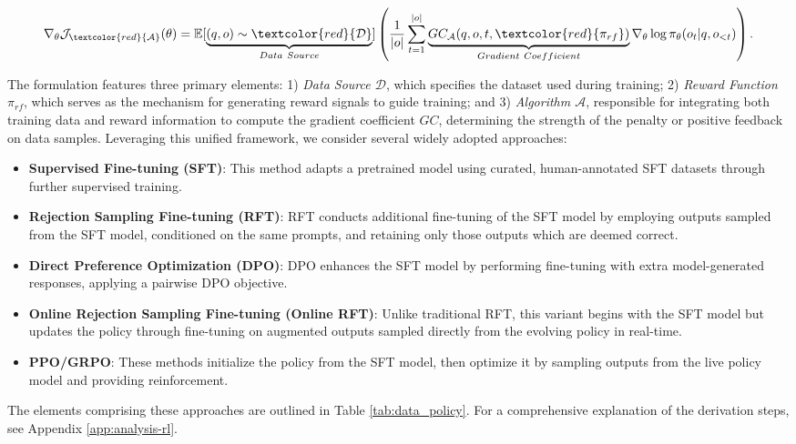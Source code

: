 \begin{itemize}[topsep=0pt]
\begin{equation}
    \nabla_{\theta}\mathcal{J}_{\textcolor{red}{\mathcal{A}}}(\theta) = \mathbb{E}[\underbrace{(q,o) \sim \textcolor{red}{\mathcal{D}}}_{Data \ Source}]\left( \frac{1}{|o|} \sum_{t=1}^{|o|}  \underbrace{GC_{{\mathcal{A}}}(q, o, t, \textcolor{red}{\pi_{{rf}}})}_{Gradient \ Coefficient}  \nabla_{\theta}\log \pi_{\theta}(o_t | q, o_{<t})\right).
\label{eq:objective}
\end{equation}

The formulation features three primary elements: 1) \textit{Data Source $\mathcal{D}$}, which specifies the dataset used during training; 2) \textit{Reward Function $\pi_{{rf}}$}, which serves as the mechanism for generating reward signals to guide training; and 3) \textit{Algorithm $\mathcal{A}$}, responsible for integrating both training data and reward information to compute the gradient coefficient $GC$, determining the strength of the penalty or positive feedback on data samples. Leveraging this unified framework, we consider several widely adopted approaches:

\begin{itemize}
    \item  \textbf{Supervised Fine-tuning (SFT)}: This method adapts a pretrained model using curated, human-annotated SFT datasets through further supervised training.
    \item \textbf{Rejection Sampling Fine-tuning (RFT)}: RFT conducts additional fine-tuning of the SFT model by employing outputs sampled from the SFT model, conditioned on the same prompts, and retaining only those outputs which are deemed correct.
    \item \textbf{Direct Preference Optimization (DPO)}: DPO enhances the SFT model by performing fine-tuning with extra model-generated responses, applying a pairwise DPO objective.
    \item \textbf{Online Rejection Sampling Fine-tuning (Online RFT)}: Unlike traditional RFT, this variant begins with the SFT model but updates the policy through fine-tuning on augmented outputs sampled directly from the evolving policy in real-time.
    \item \textbf{PPO/GRPO}: These methods initialize the policy from the SFT model, then optimize it by sampling outputs from the live policy model and providing reinforcement.
\end{itemize}

The elements comprising these approaches are outlined in Table \ref{tab:data_policy}. For a comprehensive explanation of the derivation steps, see Appendix \ref{app:analysis-rl}.


\end{itemize}
